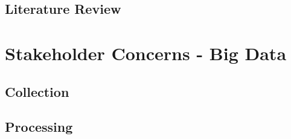 \documentclass[12pt]{article} %
\begin{document}
		
		\subsection{Literature Review}
	
	
	
	
	
	
	
	\section{Stakeholder Concerns - Big Data}
	
	
	
	\subsection{Collection}
	
	
	
	
	\subsection{Processing}
	
\end{document}
